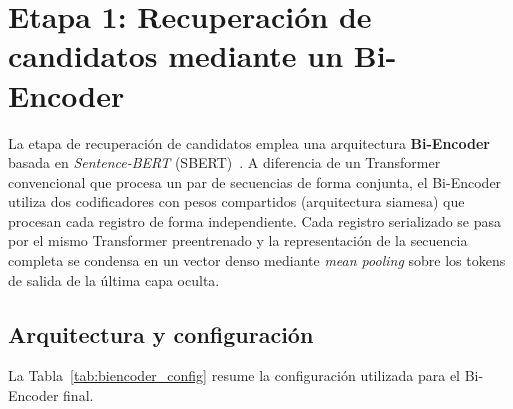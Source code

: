 \section{Etapa 1: Recuperación de candidatos mediante un Bi-Encoder}
\label{sec:bi_encoder}

La etapa de recuperación de candidatos emplea una arquitectura \textbf{Bi-Encoder} basada en \textit{Sentence-BERT} (SBERT)~\cite{reimers2019}. A diferencia de un Transformer convencional que procesa un par de secuencias de forma conjunta, el Bi-Encoder utiliza dos codificadores con pesos compartidos (arquitectura siamesa) que procesan cada registro de forma independiente. Cada registro serializado se pasa por el mismo Transformer preentrenado y la representación de la secuencia completa se condensa en un vector denso mediante \textit{mean pooling} sobre los tokens de salida de la última capa oculta.

\subsection{Arquitectura y configuración}

La Tabla~\ref{tab:biencoder_config} resume la configuración utilizada para el Bi-Encoder final.

